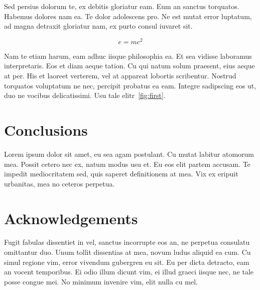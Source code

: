 \documentclass[letterpaper]{article}
\newcommand{\be}{\begin{equation}}
\newcommand{\ee}{\end{equation}}
\begin{document}
Sed persius dolorum te, ex debitis gloriatur eam. Eum an sanctus torquatos. Habemus dolores nam ea. Te dolor adolescens pro. Ne est mutat error luptatum, ad magna detraxit gloriatur nam, ex purto consul iuvaret sit.

\be
\label{eq:emc}
e = mc^2
\ee

Nam te etiam harum, eam adhuc iisque philosophia ea. Et sea vidisse laboramus interpretaris. Eos et diam aeque tation. Cu qui natum solum praesent, eius aeque at per. His et laoreet verterem, vel at appareat lobortis scribentur. Nostrud torquatos voluptatum ne nec, percipit probatus ea eam. Integre sadipscing eos ut, duo ne vocibus delicatissimi. Usu tale elitr~\ref{fig:first}. 


\section{Conclusions}

Lorem ipsum dolor sit amet, eu sea agam postulant. Cu mutat labitur atomorum mea. Possit cetero nec ex, natum modus usu et. Eu eos elit partem accusam. Te impedit mediocritatem sed, quis saperet definitionem at mea. Vix ex eripuit urbanitas, mea no ceteros perpetua.

\section*{Acknowledgements}

Fugit fabulas dissentiet in vel, sanctus incorrupte eos an, ne perpetua consulatu omittantur duo. Unum tollit dissentias at mea, novum ludus aliquid ea cum. Cu simul regione vim, error vivendum gubergren eu sit. Eu per dicta detracto, eam an vocent temporibus. Ei odio illum dicunt vim, ei illud graeci iisque nec, ne tale posse congue mei. No minimum invenire vim, elit nulla cu mel.



 


\end{document}
